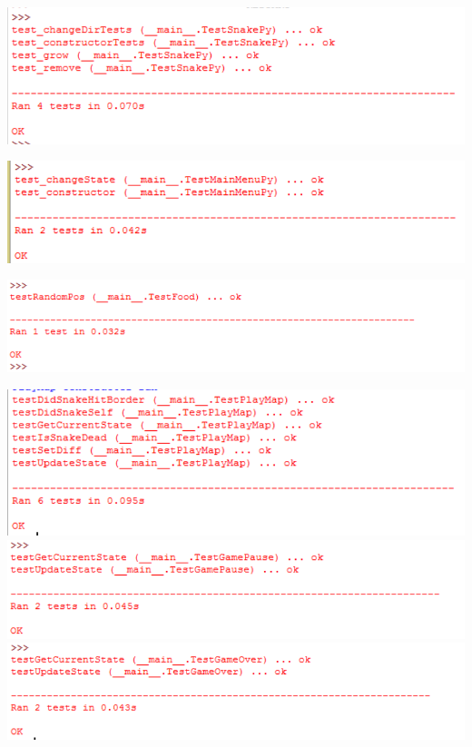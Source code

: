 \documentclass[12pt]{article}
\begin{document}
\includegraphics{testSnakeResults}\newline\newline

\includegraphics{testMainMenuResults}\newline\newline


\includegraphics{testFoodResults}\newline\newline

\includegraphics{testPlayMapResults}\newline\newline
\includegraphics{testGamePauseResults}\newline\newline
\includegraphics{testGameOverResults}\newline\newline
\end{document}
